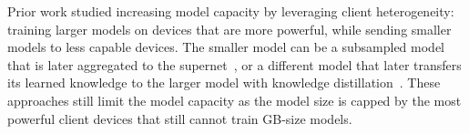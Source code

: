 \documentclass{article}
\begin{document}
Prior work studied increasing model capacity by leveraging client heterogeneity: training larger models on devices that are more powerful, while sending smaller models to less capable devices. The smaller model can be a subsampled model that is later aggregated to the supernet~\cite{expanding_reach,fjord, heterofl}, or a different model that later transfers its learned knowledge to the larger model with knowledge distillation~\cite{lin2020ensemble, fedmd}.
%
These approaches still limit the model capacity as the model size is capped by the most powerful client devices that still cannot train GB-size models.

%
%


\end{document}
